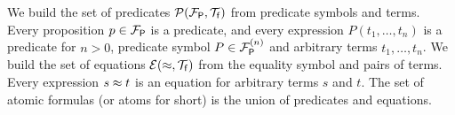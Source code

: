 
\begin{definition}\label{def:predicates}
	We build the set of {\myem predicates} ${{\mathcal P}({{\mathcal F}_{\mathsf P}},{\mathcal T}_{\mathsf f}})$
	from predicate symbols and terms. 
	Every proposition $p\in {{\mathcal F}_{\mathsf P}}$ is a predicate, 
	and every expression $P(t_1,\ldots,t_n)$ is a predicate for $n>0$,
	predicate symbol $P\in{{\mathcal F}_{\mathsf P}^{(n)}}$ and arbitrary terms $t_1,\ldots,t_n$.
%	
	We build the set of {\myem equations }${{\mathcal E}(\approx, {\mathcal T}_{\mathsf f}})$ from the equality symbol and pairs of terms.
	Every expression $s\approx t$ is an equation for arbitrary terms $s$ and $t$.
%	
	The set of atomic formulas (or {\myem atoms }for short) is the union of predicates and equations.
\end{definition}